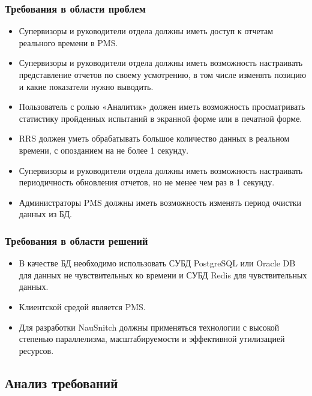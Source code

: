 \subsubsection{Требования в области проблем}

\begin{itemize}
    \item Супервизоры и руководители отдела должны иметь доступ к отчетам реального времени в PMS\@.
    \item Супервизоры и руководители отдела должны иметь возможность настраивать представление отчетов по своему усмотрению, в том числе изменять позицию и какие показатели нужно выводить.
    \item Пользователь с ролью «Аналитик» должен иметь возможность просматривать статистику пройденных испытаний в экранной форме или в печатной форме.
    \item RRS должен уметь обрабатывать большое количество данных в реальном времени, с опозданием на не более 1 секунду.
    \item Супервизоры и руководители отдела должны иметь возможность настраивать периодичность обновления отчетов, но не менее чем раз в 1 секунду.
    \item Администраторы PMS должны иметь возможность изменять период очистки данных из БД.
\end{itemize}

\subsubsection{Требования в области решений}

\begin{itemize}
    \item В качестве БД необходимо использовать СУБД PostgreSQL или Oracle DB для данных не чувствительных ко времени и СУБД Redis для чувствительных данных.
    \item Клиентской средой является PMS\@.
    \item Для разработки NauSnitch должны применяться технологии с высокой степенью параллелизма, масштабируемости и эффективной утилизацией ресурсов.
\end{itemize}

\subsection{Анализ требований}

